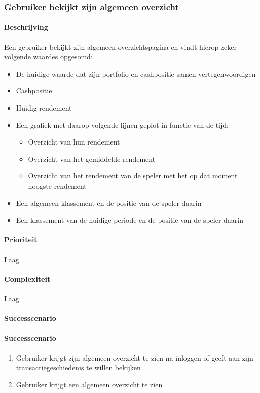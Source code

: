 \subsubsection{Gebruiker bekijkt zijn algemeen overzicht}
\paragraph{Beschrijving} Een gebruiker bekijkt zijn algemeen overzichtspagina en vindt hierop zeker volgende waardes opgesomd:
\begin{itemize}
	\item De huidige waarde dat zijn portfolio en cashpositie samen vertegenwoordigen
	\item Cashpositie
	\item Huidig rendement
	\item Een grafiek met daarop volgende lijnen geplot in functie van de tijd:
  \begin{itemize}
  	\item  Overzicht van hun rendement
    \item Overzicht van het gemiddelde rendement
    \item Overzicht van het rendement van de speler met het op dat moment hoogste rendement
  \end{itemize}
  \item Een algemeen klassement en de positie van de speler daarin
  \item Een klassement van de huidige periode en de positie van de speler daarin
\end{itemize}
\paragraph{Prioriteit}Laag
\paragraph{Complexiteit}Laag
\paragraph{Successcenario}
\paragraph{Successcenario}
\begin{enumerate}
 \item Gebruiker krijgt zijn algemeen overzicht te zien na inloggen of geeft aan zijn transactiegeschiedenis te willen bekijken
 \item Gebruiker krijgt een algemeen overzicht te zien
\end{enumerate}

